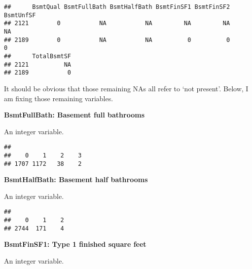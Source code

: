 \documentclass[]{article}
\newenvironment{Shaded}{\begin{snugshade}}{\end{snugshade}}
\newcommand{\DecValTok}[1]{\textcolor[rgb]{0.00,0.00,0.81}{#1}}
\newcommand{\KeywordTok}[1]{\textcolor[rgb]{0.13,0.29,0.53}{\textbf{#1}}}
\newcommand{\NormalTok}[1]{#1}
\newcommand{\OperatorTok}[1]{\textcolor[rgb]{0.81,0.36,0.00}{\textbf{#1}}}
\begin{document}
\begin{verbatim}
##      BsmtQual BsmtFullBath BsmtHalfBath BsmtFinSF1 BsmtFinSF2 BsmtUnfSF
## 2121        0           NA           NA         NA         NA        NA
## 2189        0           NA           NA          0          0         0
##      TotalBsmtSF
## 2121          NA
## 2189           0
\end{verbatim}

It should be obvious that those remaining NAs all refer to `not
present'. Below, I am fixing those remaining variables.

\textbf{BsmtFullBath: Basement full bathrooms}

An integer variable.

\begin{Shaded}
\end{Shaded}

\begin{verbatim}
## 
##    0    1    2    3 
## 1707 1172   38    2
\end{verbatim}

\textbf{BsmtHalfBath: Basement half bathrooms}

An integer variable.

\begin{Shaded}
\end{Shaded}

\begin{verbatim}
## 
##    0    1    2 
## 2744  171    4
\end{verbatim}

\textbf{BsmtFinSF1: Type 1 finished square feet}

An integer variable.

\begin{Shaded}
\end{Shaded}
\end{document}
